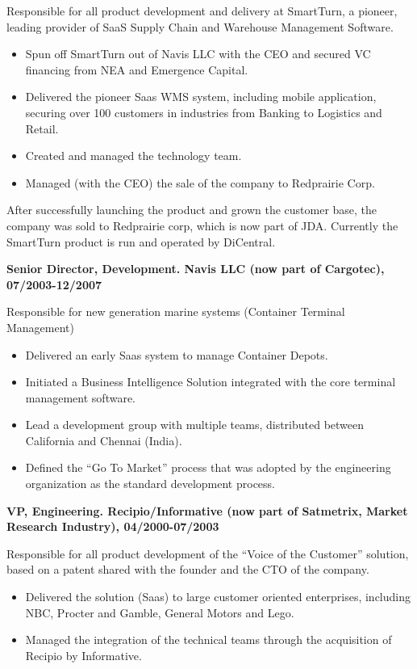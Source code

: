 \documentclass{res}
\begin{document}
\begin{resume}
Responsible for all product development and delivery at SmartTurn, a pioneer, leading provider of SaaS Supply Chain and Warehouse Management Software.
\begin{itemize}
    \item Spun off SmartTurn out of Navis LLC with the CEO and secured VC financing from NEA and Emergence Capital.
    \item Delivered the pioneer Saas WMS system, including mobile application,  securing over 100 customers in industries from Banking to Logistics and Retail.
    \item Created and managed the technology team.
    \item Managed (with the CEO) the sale of the company to Redprairie Corp.
\end{itemize}
After successfully launching the product and grown the customer base, the company was sold to Redprairie corp, which is now part of JDA. Currently the SmartTurn product is run and operated by DiCentral.

{\bf Senior Director, Development. Navis LLC (now part of Cargotec), 07/2003-12/2007}

Responsible for new generation marine systems (Container Terminal Management)
\begin{itemize}
    \item Delivered an early Saas system to manage Container Depots.
    \item Initiated a Business Intelligence Solution integrated with the core terminal management software.
    \item Lead a development group with multiple teams, distributed between California and Chennai (India).
    \item Defined the “Go To Market” process that was adopted by the engineering organization as the standard development process.
\end{itemize}

{\bf VP, Engineering. Recipio/Informative (now part of Satmetrix, Market Research Industry), 04/2000-07/2003}

    Responsible for all product development of the “Voice of the Customer” solution, based on a patent shared with the founder and the CTO of the company. 
\begin{itemize}
    \item Delivered the solution (Saas) to large customer oriented enterprises, including NBC, Procter and Gamble, General Motors and Lego.
    \item Managed the integration of the technical teams through the acquisition of Recipio by Informative.
\end{itemize}


\end{resume}
\end{document}
